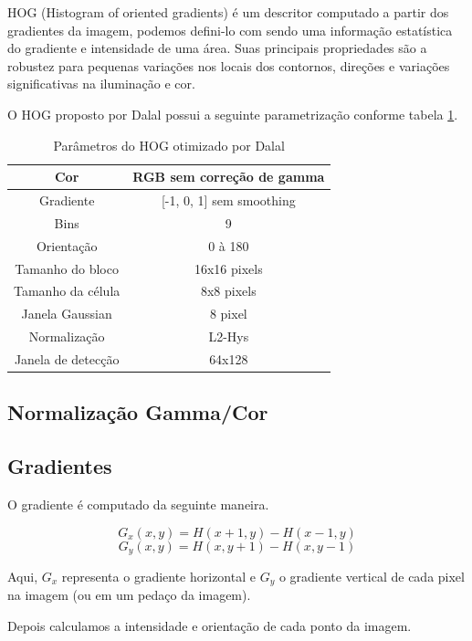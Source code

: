 HOG (Histogram of oriented gradients) é um descritor computado a partir dos gradientes da imagem, podemos defini-lo com sendo uma informação estatística do gradiente e intensidade de uma área. Suas principais propriedades são a robustez para pequenas variações nos locais dos contornos, direções e variações significativas na iluminação e cor.

O HOG proposto por Dalal \cite{dalal} possui a seguinte parametrização conforme tabela \ref{table:dlal_hog}.


\begin{table}[h]
\centering
\begin{tabular}{|c|c|}
\hline Cor & RGB sem correção de gamma \\ 
\hline Gradiente & [-1, 0, 1] sem smoothing \\ 
\hline Bins & 9 \\
\hline Orientação & 0 à 180 \\
\hline Tamanho do bloco & 16x16 pixels \\
\hline Tamanho da célula & 8x8 pixels \\
\hline Janela Gaussian & 8 pixel \\
\hline Normalização & L2-Hys \\
\hline Janela de detecção & 64x128 \\
\hline 
\end{tabular} 
\caption{Parâmetros do HOG otimizado por Dalal}
\label{table:dlal_hog}
\end{table}

\subsection{Normalização Gamma/Cor}

\subsection{Gradientes}

O gradiente é computado da seguinte maneira.

\[G_{x}(x,y) = H(x+1, y) - H(x-1, y)\]
\[G_{y}(x,y) = H(x, y+1) - H(x, y-1)\]

Aqui, \(G_{x}\) representa o gradiente horizontal e \(G_{y}\) o gradiente vertical de cada pixel na imagem (ou em um pedaço da imagem).

Depois calculamos a intensidade e orientação de cada ponto da imagem.

